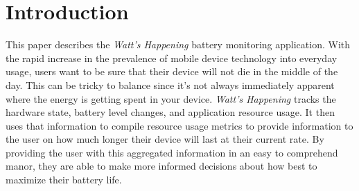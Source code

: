 \section*{Introduction}
\label{sec:intro}
This paper describes the \emph{Watt's Happening} battery monitoring application. 
With the rapid increase in the prevalence of mobile device technology into everyday usage, users want to be sure that their device will not die in the middle of the day.
This can be tricky to balance since it's not always immediately apparent where the energy is getting spent in your device.
\emph{Watt's Happening} tracks the hardware state, battery level changes, and application resource usage. 
It then uses that information to compile resource usage metrics to provide information to the user on how much longer their device will last at their current rate.
By providing the user with this aggregated information in an easy to comprehend manor, they are able to make more informed decisions about how best to maximize their battery life.

